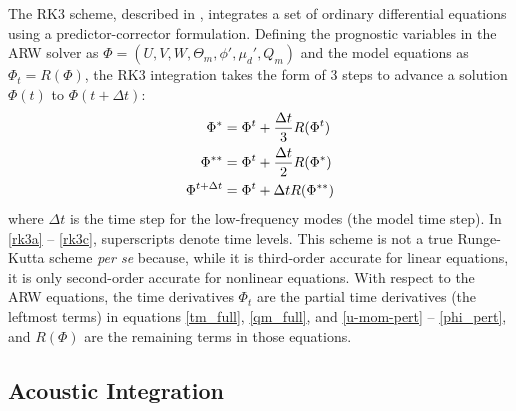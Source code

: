 The RK3 scheme, described in \citet{wicker02},
integrates a set of ordinary differential equations using a
predictor-corrector formulation.  Defining the prognostic variables in
the ARW solver as $\Phi = (U,V,W,\Theta_m,\phi', \mu_d', Q_m)$ and the 
model equations as $\Phi_t = R(\Phi)$, the RK3
integration takes the form of 3 steps to advance a solution 
$\Phi(t)$ to $\Phi(t+\Delta t)$:
%
\begin{align}
\Phi^* & = \Phi^t + {\Delta t \over 3} R(\Phi^t) 
\label{rk3a}
\\
\Phi^{**} & = \Phi^t + {\Delta t \over 2} R(\Phi^*) 
\label{rk3b}
\\
\Phi^{t+\Delta t} & = \Phi^t + {\Delta t} R(\Phi^{**})
\label{rk3c}
\end{align}
%
\noindent
where $\Delta t$ is the time step for the low-frequency modes
(the model time step).
In \eqref{rk3a} -- \eqref{rk3c}, superscripts denote time levels.
This scheme is not a true Runge-Kutta scheme {\it per se} because, while it is 
third-order accurate for linear equations, it is only second-order accurate
for nonlinear equations.  With respect to the ARW equations, the 
time derivatives $\Phi_t$ are the partial time derivatives (the leftmost
terms) in equations \eqref{tm_full}, \eqref{qm_full}, and \eqref{u-mom-pert} -- \eqref{phi_pert}, and
$R(\Phi)$ are the remaining terms in those equations.

\subsection{Acoustic Integration}
\label{acoustic_equations}

